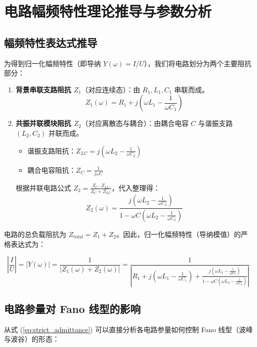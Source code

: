 \documentclass[12pt]{article}
\begin{document}
\section{电路幅频特性理论推导与参数分析}

\subsection{幅频特性表达式推导}
\hspace{2em}
为得到归一化幅频特性（即导纳 $Y(\omega) = I/U$），我们将电路划分为两个主要阻抗部分：

\begin{enumerate}
    \item \textbf{背景串联支路阻抗 $Z_1$}（对应连续态）：由 $R_1, L_1, C_1$ 串联而成。
    \begin{equation}
        Z_1(\omega) = R_1 + j\left(\omega L_1 - \frac{1}{\omega C_1}\right)
    \end{equation}
    
    \item \textbf{共振并联模块阻抗 $Z_2$}（对应离散态与耦合）：由耦合电容 $C$ 与谐振支路 $(L_2, C_2)$ 并联而成。
    \begin{itemize}
        \item 谐振支路阻抗：$Z_{LC} = j\left(\omega L_2 - \frac{1}{\omega C_2}\right)$
        \item 耦合电容阻抗：$Z_C = \frac{1}{j\omega C}$
    \end{itemize}
    根据并联电路公式 $Z_2 = \frac{Z_C \cdot Z_{LC}}{Z_C + Z_{LC}}$，代入整理得：
    \begin{equation}
        Z_2(\omega) = \frac{j\left(\omega L_2 - \frac{1}{\omega C_2}\right)}{1 - \omega C \left(\omega L_2 - \frac{1}{\omega C_2}\right)}
    \end{equation}
\end{enumerate}

电路的总负载阻抗为 $Z_{total} = Z_1 + Z_2$。因此，归一化幅频特性（导纳模值）的严格表达式为：

\begin{equation}
    \left| \frac{I}{U} \right| = \left| Y(\omega) \right| = \frac{1}{\left| Z_1(\omega) + Z_2(\omega) \right|} 
    = \frac{1}{\left| R_1 + j(\omega L_1 - \frac{1}{\omega C_1}) + \frac{j(\omega L_2 - \frac{1}{\omega C_2})}{1 - \omega C (\omega L_2 - \frac{1}{\omega C_2})} \right|}
    \label{eq:strict_admittance}
\end{equation}

\subsection{电路参量对 Fano 线型的影响}
\hspace{2em}
从式 (\ref{eq:strict_admittance}) 可以直接分析各电路参量如何控制 Fano 线型（波峰与波谷）的形态：
\end{document}

